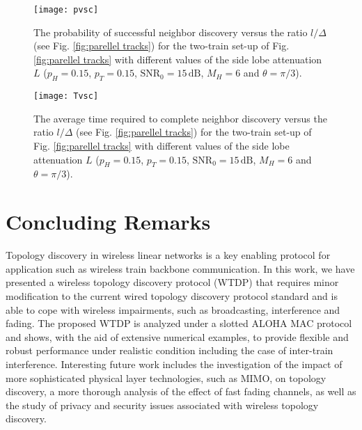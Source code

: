 \documentclass[10pt,english,two column]{IEEEtran}
\begin{document}
\begin{figure}[h]
\begin{centering}
\textsf{\texttt{[image: pvsc]}}
\par\end{centering}

\caption{\label{fig:PvsC}The probability of successful neighbor discovery
versus the ratio $l/\Delta$ (see Fig. \ref{fig:parellel tracks})
for the two-train set-up of Fig. \ref{fig:parellel tracks} with different
values of the side lobe attenuation $L$ ($p_{H}=0.15$, $p_{T}=0.15$,
$\mathrm{SNR}_{0}=15\,\mathrm{dB}$, $M_{H}=6$ and $\theta=\pi/3$).}
\end{figure}


\begin{figure}[h]
\begin{centering}
\textsf{\texttt{[image: Tvsc]}}
\par\end{centering}

\caption{\label{fig:TvsC}The average time required to complete neighbor discovery
versus the ratio $l/\Delta$ (see Fig. \ref{fig:parellel tracks})
for the two-train set-up of Fig. \ref{fig:parellel tracks} with different
values of the side lobe attenuation $L$ ($p_{H}=0.15$, $p_{T}=0.15$,
$\mathrm{SNR}_{0}=15\,\mathrm{dB}$, $M_{H}=6$ and $\theta=\pi/3$). }
\end{figure}



\section{Concluding Remarks}

Topology discovery in wireless linear networks is a key enabling protocol
for application such as wireless train backbone communication. In
this work, we have presented a wireless topology discovery protocol
(WTDP) that requires minor modification to the current wired topology
discovery protocol standard and is able to cope with wireless impairments,
such as broadcasting, interference and fading. The proposed WTDP is
analyzed under a slotted ALOHA MAC protocol and shows, with the aid
of extensive numerical examples, to provide flexible and robust performance
under realistic condition including the case of inter-train interference.
Interesting future work includes the investigation of the impact of
more sophisticated physical layer technologies, such as MIMO, on topology
discovery, a more thorough analysis of the effect of fast fading channels,
as well as the study of privacy and security issues associated with
wireless topology discovery.
\end{document}
